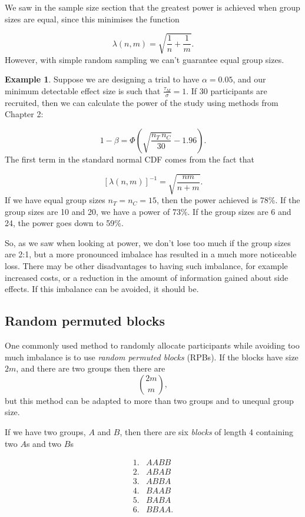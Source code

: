 \documentclass[
  openany]{book}
\theoremstyle{definition}
\theoremstyle{definition}
\newtheorem{example}{Example}[chapter]
\theoremstyle{definition}
\theoremstyle{definition}
\theoremstyle{remark}
\begin{document}
We saw in the sample size section that the greatest power is achieved when group sizes are equal, since this minimises the function

\[\lambda\left(n,m\right) = \sqrt{\frac{1}{n}+\frac{1}{m}}.\]
However, with simple random sampling we can't guarantee equal group sizes.

\begin{example}
Suppose we are designing a trial to have \(\alpha=0.05\), and our minimum detectable effect size is such that \(\frac{\tau_M}{\sigma}=1\). If 30 participants are recruited, then we can calculate the power of the study using methods from Chapter 2:

\[1-\beta = \Phi\left(\sqrt{\frac{n_T\,n_C}{30}} - 1.96\right). \]
The first term in the standard normal CDF comes from the fact that

\[\left[\lambda\left(n,m\right)\right]^{-1} = \sqrt{\frac{nm}{n+m}} .\]
If we have equal group sizes \(n_T=n_C=15\), then the power achieved is 78\%.
If the group sizes are 10 and 20, we have a power of 73\%.
If the group sizes are 6 and 24, the power goes down to 59\%.

So, as we saw when looking at power, we don't lose too much if the group sizes are 2:1, but a more pronounced imbalace has resulted in a much more noticeable loss. There may be other disadvantages to having such imbalance, for example increased costs, or a reduction in the amount of information gained about side effects. If this imbalance can be avoided, it should be.
\end{example}

\hypertarget{random-permuted-blocks}{%
\subsection{Random permuted blocks}\label{random-permuted-blocks}}

One commonly used method to randomly allocate participants while avoiding too much imbalance is to use \emph{random permuted blocks} (RPBs). If the blocks have size \(2m\), and there are two groups then there are \[\binom{2m}{m},\] but this method can be adapted to more than two groups and to unequal group size.

If we have two groups, \(A\) and \(B\), then there are six \emph{blocks} of length 4 containing two \(A\)s and two \(B\)s

\[
\begin{aligned}
1.& AABB\\
2.& ABAB\\
3.& ABBA\\
4.& BAAB\\
5.& BABA\\
6.& BBAA.
\end{aligned}
\]
\end{document}
